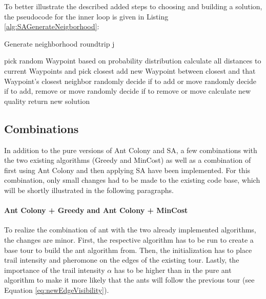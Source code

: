 To better illustrate the described added steps to choosing and building a solution, the pseudocode for the inner loop is given in Listing \ref{alg:SAGenerateNeigborhood}:



\begin{breakablealgorithm}
	\caption{Generate neighborhood roundtrip j}
	\label{alg:SAGenerateNeigborhood}
	\begin{algorithmic}[1]
		\STATE pick random Waypoint based on probability distribution
		\STATE calculate all distances to current Waypoints and pick closest
		\STATE add new Waypoint between closest and that Waypoint's closest neighbor
		\ELSE {}
		\STATE randomly decide if to add or move
		\ELSE {}
		\STATE randomly decide if to add, remove or move
		\ELSE 
		\STATE randomly decide if to remove or move
		\ENDIF
		\ENDIF
		\ENDIF
		\STATE calculate new quality
		\STATE return new solution
	\end{algorithmic}
\end{breakablealgorithm}


\subsection{Combinations}
\label{subsec:algoCombinations}

In addition to the pure versions of Ant Colony and SA, a few combinations with the two existing algorithms (Greedy and MinCost) as well as a combination of first using Ant Colony and then applying SA have been implemented.
For this combination, only small changes had to be made to the existing code base, which will be shortly illustrated in the following paragraphs.

\paragraph{Ant Colony + Greedy and Ant Colony + MinCost}

To realize the combination of ant with the two already implemented algorithms, the changes are minor.
First, the respective algorithm has to be run to create a base tour to build the ant algorithm from.
Then, the initialization has to place trail intensity and pheromone on the edges of the existing tour.
Lastly, the importance of the trail intensity $\alpha$ has to be higher than in the pure ant algorithm to make it more likely that the ants will follow the previous tour (see Equation \ref{eq:newEdgeVisibility}).


